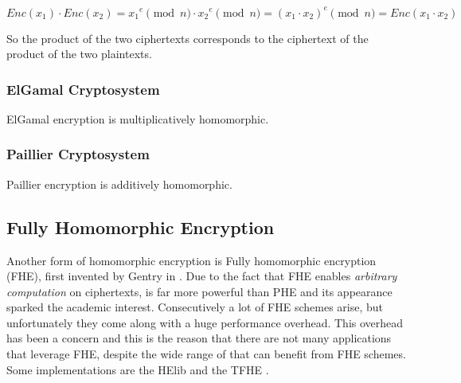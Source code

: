 \begin{equation}
Enc(x_1) \cdot Enc(x_2) = {x_1}^{e}\pmod{n} \cdot {x_2}^{e}\pmod{n} = ({x_1}\cdot{x_2})^{e}\pmod{n} = Enc({x_1}\cdot{x_2})
\end{equation}

So the product of the two ciphertexts corresponds to the ciphertext of the product of the two plaintexts.

\subsubsection{ElGamal Cryptosystem}\label{ss:elgamal}

ElGamal encryption is multiplicatively homomorphic.


\subsubsection{Paillier Cryptosystem}\label{ss:paillier}
Paillier encryption is additively homomorphic.


\subsection{Fully Homomorphic Encryption}\label{ss:fhe}
Another form of homomorphic encryption is Fully homomorphic encryption (FHE), first invented by Gentry in \cite{gentry2009fully}.
Due to the fact that FHE enables \textit{arbitrary computation} on ciphertexts, is far more powerful than PHE and its appearance sparked the academic interest.
Consecutively a lot of FHE schemes arise, but unfortunately they come along with a huge performance overhead.
This overhead has been a concern and this is the reason that there are not many applications that leverage FHE, despite the wide range of that can benefit from FHE schemes.
Some implementations are the HElib \cite{halevi2014algorithms} and the TFHE \cite{chillotti2016faster}.


